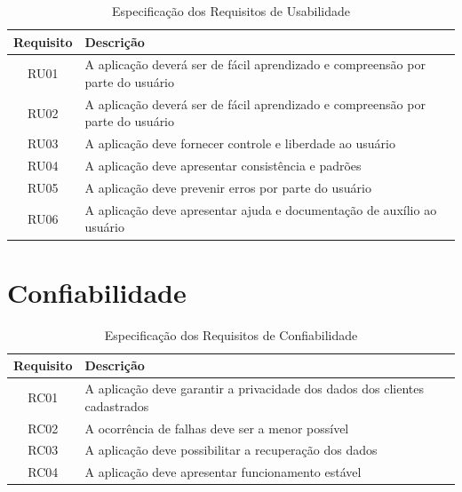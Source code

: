 \begin{apendicesenv}
\begin{table}[H]
                \centering
                \caption{Especificação dos Requisitos de Usabilidade}
                \begin{tabular}{c|p{10cm}}
                    \hline
                    \textbf{Requisito}            & \textbf{Descrição}\\
                    \hline
                    RU01 & A aplicação deverá ser de fácil aprendizado e compreensão por parte do usuário \\
                    \hline
                    RU02 & A aplicação deverá ser de fácil aprendizado e compreensão por parte do usuário \\
                    RU03 & A aplicação deve fornecer controle e liberdade ao usuário\\
                    \hline
                    RU04 & A aplicação deve apresentar consistência e padrões\\
                    \hline
                    RU05 & A aplicação deve prevenir erros por parte do usuário\\
                    \hline
                    RU06 & A aplicação deve apresentar ajuda e documentação de auxílio ao usuário\\
                    \hline
                \end{tabular}
            \end{table}


{\large {\section { Confiabilidade \\ } } }

\begin{table}[H]
                \centering
                \caption{Especificação dos Requisitos de Confiabilidade}
                \begin{tabular}{c|p{10cm}}
                    \hline
                    \textbf{Requisito}            & \textbf{Descrição}\\
                    \hline
                    RC01 & A aplicação deve garantir a privacidade dos dados dos clientes cadastrados\\
                    \hline
                    RC02 & A ocorrência de falhas deve ser a menor possível\\
                    \hline
                    RC03 & A aplicação deve possibilitar a recuperação dos dados\\
                    \hline
                    RC04 & A aplicação deve apresentar funcionamento estável\\
                    \hline
                \end{tabular}
            \end{table}



\end{apendicesenv}
